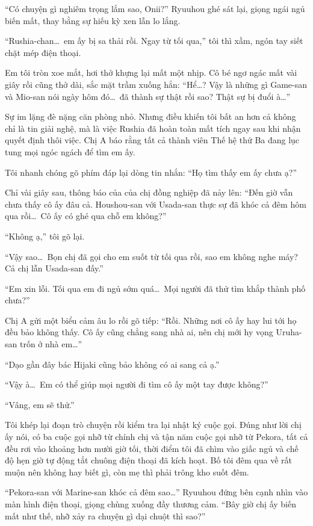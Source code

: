 \documentclass[../main.tex]{subfiles}
\begin{document}
``Có chuyện gì nghiêm trọng lắm sao, Onii?'' Ryuuhou ghé sát lại, giọng ngái ngủ biến mất, thay bằng sự hiếu kỳ xen lẫn lo lắng.

``Rushia-chan\dots\ em ấy bị sa thải rồi. Ngay từ tối qua,'' tôi thì xầm, ngón tay siết chặt mép điện thoại.

Em tôi tròn xoe mắt, hơi thở khựng lại mất một nhịp. Cô bé ngơ ngác mất vài giây rồi cũng thở dài, sắc mặt trầm xuống hẳn: ``Hể\dots? Vậy là những gì Game-san và Mio-san nói ngày hôm đó\dots\ đã thành sự thật rồi sao? Thật sự bị đuổi à\dots''

Sự im lặng đè nặng căn phòng nhỏ. Nhưng điều khiến tôi bất an hơn cả không chỉ là tin giải nghệ, mà là việc Rushia đã hoàn toàn mất tích ngay sau khi nhận quyết định thôi việc. Chị A báo rằng tất cả thành viên Thế hệ thứ Ba đang lục tung mọi ngóc ngách để tìm em ấy.

Tôi nhanh chóng gõ phím đáp lại dòng tin nhắn: ``Họ tìm thấy em ấy chưa ạ?''

Chỉ vài giây sau, thông báo của của chị đồng nghiệp đã nảy lên: ``Đến giờ vẫn chưa thấy cô ấy đâu cả. Houshou-san với Usada-san thực sự đã khóc cả đêm hôm qua rồi\dots\ Cô ấy có ghé qua chỗ em không?''

``Không ạ,'' tôi gõ lại.

``Vậy sao\dots\ Bọn chị đã gọi cho em suốt từ tối qua rồi, sao em không nghe máy? Cả chị lẫn Usada-san đấy.''

``Em xin lỗi. Tối qua em đi ngủ sớm quá\dots\ Mọi người đã thử tìm khắp thành phố chưa?''

Chị A gửi một biểu cảm âu lo rồi gõ tiếp: ``Rồi. Những nơi cô ấy hay lui tới họ đều bảo không thấy. Cô ấy cũng chẳng sang nhà ai, nên chị mới hy vọng Uruha-san trốn ở nhà em\dots''

``Dạo gần đây bác Hijaki cũng bảo không có ai sang cả ạ.''

``Vậy à\dots\ Em có thể giúp mọi người đi tìm cô ấy một tay được không?''

``Vâng, em sẽ thử.''

Tôi khép lại đoạn trò chuyện rồi kiểm tra lại nhật ký cuộc gọi. Đúng như lời chị ấy nói, có ba cuộc gọi nhỡ từ chính chị và tận năm cuộc gọi nhỡ từ Pekora, tất cả đều rơi vào khoảng hơn mười giờ tối, thời điểm tôi đã chìm vào giấc ngủ và chế độ hẹn giờ tự động tắt chuông điện thoại đã kích hoạt. Bố tôi đêm qua về rất muộn nên không hay biết gì, còn mẹ thì phải trông kho suốt đêm.

``Pekora-san với Marine-san khóc cả đêm sao\dots'' Ryuuhou đứng bên cạnh nhìn vào màn hình điện thoại, giọng chùng xuống đầy thương cảm. ``Bây giờ chị ấy biến mất như thế, nhỡ xảy ra chuyện gì dại chuột thì sao?''
\end{document}
